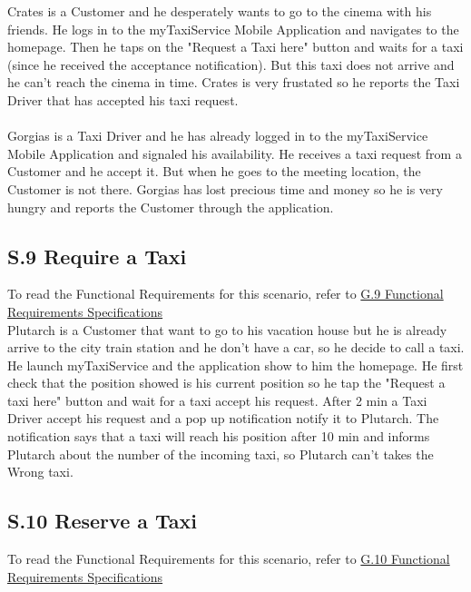 		\label{sec:TaxiDriverReportingScenario}
		Crates is a Customer and he desperately wants to go to the cinema with his friends. He logs in to the myTaxiService Mobile Application and navigates to the homepage. Then he taps on the "Request a Taxi here" button and waits for a taxi (since he received the acceptance notification). But this taxi does not arrive and he can't reach the cinema in time. Crates is very frustated so he reports the Taxi Driver that has accepted his taxi request.
		\\
		\\
		\label{sec:CustomerReportingScenario}
		Gorgias is a Taxi Driver and he has already logged in to the myTaxiService Mobile Application and signaled his availability. He receives a taxi request from a Customer and he accept it. But when he goes to the meeting location, the Customer is not there. Gorgias has lost precious time and money so he is very hungry and reports the Customer through the application. 
		
		\subsection{S.9 Require a Taxi}\label{sec:TaxiRequiringScenario}
		To read the Functional Requirements for this scenario, refer to \hyperref[sec:frs9]{G.9 Functional Requirements Specifications}\\

		Plutarch is a Customer that want to go to his vacation house but he is already arrive to the city train station and he don't have a car, so he decide to call a taxi. He launch myTaxiService and the application show to him the homepage. He first check that the position showed is his current position so he tap the "Request a taxi here" button and wait for a taxi accept his request. After 2 min a Taxi Driver accept his request and a pop up notification notify it to Plutarch. The notification says that a taxi will reach his position after 10 min and informs Plutarch about the number of the incoming taxi, so Plutarch can't takes the Wrong taxi.

		\subsection{S.10 Reserve a Taxi}\label{sec:TaxiReservationScenario}
		To read the Functional Requirements for this scenario, refer to \hyperref[sec:frs10]{G.10 Functional Requirements Specifications}\\

